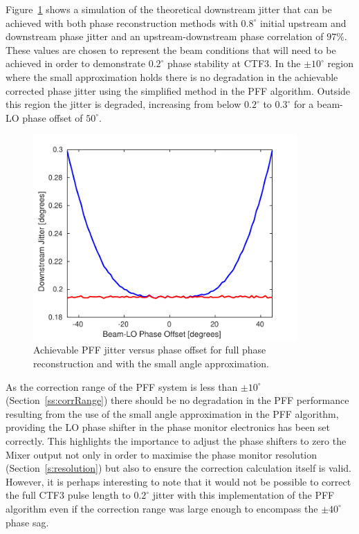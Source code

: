 Figure~\ref{f:phaseRecJitSim} shows a simulation of the theoretical downstream jitter that can be achieved with both phase reconstruction methods with \(0.8^\circ\) initial upstream and downstream phase jitter and an upstream-downstream phase correlation of \(97\%\). These values are chosen to represent the beam conditions that will need to be achieved in order to demonstrate \(0.2^\circ\) phase stability at CTF3. In the \(\pm10^\circ\) region where the small approximation holds there is no degradation in the achievable corrected phase jitter using the simplified method in the PFF algorithm. Outside this region the jitter is degraded, increasing from below \(0.2^\circ\) to \(0.3^\circ\) for a beam-LO phase offset of \(50^\circ\). 

\begin{figure}
  \centering
  \includegraphics[width=0.9\textwidth]{Figures/commissioning/phaseRecJitSim}
  \caption{Achievable PFF jitter versus phase offset for full phase reconstruction and with the small angle approximation.}
  \label{f:phaseRecJitSim}
\end{figure}

As the correction range of the PFF system is less than \(\pm10^\circ\) (Section~\ref{ss:corrRange}) there should be no degradation in the PFF performance resulting from the use of the small angle approximation in the PFF algorithm, providing the LO phase shifter in the phase monitor electronics has been set correctly. This highlights the importance to adjust the phase shifters to zero the Mixer output not only in order to maximise the phase monitor resolution (Section~\ref{s:resolution}) but also to ensure the correction calculation itself is valid. However, it is perhaps interesting to note that it would not be possible to correct the full CTF3 pulse length to \(0.2^\circ\) jitter with this implementation of the PFF algorithm even if the correction range was large enough to encompass the \(\pm40^\circ\) phase sag.

